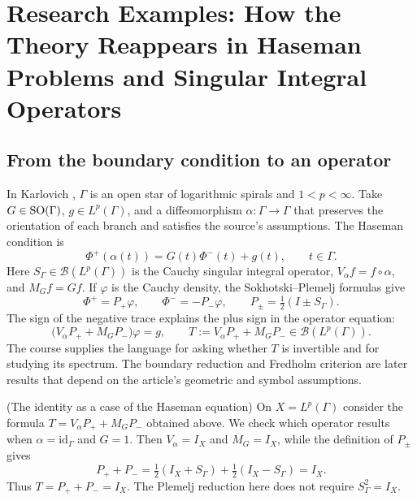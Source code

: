 \chapter{Research Examples: How the Theory Reappears in Haseman Problems and Singular Integral Operators}

\section{From the boundary condition to an operator}

In Karlovich \cite[pp.~463--464, eqs.~(1.1)--(1.2)]{Karlovich2017}, $\Gamma$ is an
open star of logarithmic spirals and $1<p<\infty$. Take $G\in\operatorname{SO}(\Gamma)$,
$g\in L^p(\Gamma)$, and a diffeomorphism $\alpha:\Gamma\to\Gamma$ that preserves
the orientation of each branch and satisfies the source's assumptions. The Haseman
condition is
\[
 \Phi^+(\alpha(t))=G(t)\Phi^-(t)+g(t),\qquad t\in\Gamma.
\]
Here $S_\Gamma\in\mathcal B(L^p(\Gamma))$ is the Cauchy singular integral operator,
$V_\alpha f=f\circ\alpha$, and $M_Gf=Gf$. If $\varphi$ is the Cauchy density, the
Sokhotski--Plemelj formulas give
\[
 \Phi^+=P_+\varphi,\qquad \Phi^-=-P_-\varphi,\qquad
 P_\pm=\tfrac12(I\pm S_\Gamma).
\]
The sign of the negative trace explains the plus sign in the operator equation:
\[
 \bigl(V_\alpha P_++M_GP_-\bigr)\varphi=g,\qquad
 T:=V_\alpha P_++M_GP_-\in\mathcal B(L^p(\Gamma)).
\]
The course supplies the language for asking whether $T$ is invertible and for
studying its spectrum. The boundary reduction and Fredholm criterion are later
results that depend on the article's geometric and symbol assumptions.

\begin{cthejemplo}{(The identity as a case of the Haseman equation)}
On $X=L^p(\Gamma)$ consider the formula $T=V_\alpha P_++M_GP_-$ obtained above.
We check which operator results when $\alpha=\mathrm{id}_\Gamma$ and $G=1$.
Then $V_\alpha=I_X$ and $M_G=I_X$, while the definition of $P_\pm$ gives
\[
 P_++P_- =\tfrac12(I_X+S_\Gamma)+\tfrac12(I_X-S_\Gamma)=I_X.
\]
Thus $T=P_++P_-=I_X$. The Plemelj reduction here does not require
$S_\Gamma^2=I_X$.
\end{cthejemplo}

\begin{center}
\end{center}

